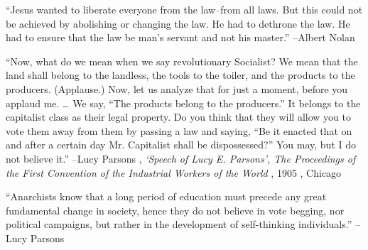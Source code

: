 \documentclass{article}%
\begin{document}
\vspace{1mm}%
\begin{minipage}{\textwidth}%
\flushleft%
“Jesus wanted to liberate everyone from the law–from all laws. But this could not be achieved by abolishing or changing the law. He had to dethrone the law. He had to ensure that the law be man's servant and not his master.”%
\linebreak%
\vspace{1mm}%
–Albert Nolan%
\linebreak%
\vspace{1mm}%
\end{minipage}%
\linebreak%
\vspace{1mm}%
\begin{minipage}{\textwidth}%
\flushleft%
“Now, what do we mean when we say revolutionary Socialist? We mean that the land shall belong to the landless, the tools to the toiler, and the products to the producers. (Applause.) Now, let us analyze that for just a moment, before you applaud me. … We say, “The products belong to the producers.” It belongs to the capitalist class as their legal property. Do you think that they will allow you to vote them away from them by passing a law and saying, “Be it enacted that on and after a certain day Mr. Capitalist shall be dispossessed?” You may, but I do not believe it.”%
\linebreak%
\vspace{1mm}%
–Lucy Parsons%
, \textit{‘Speech of Lucy E. Parsons’, The Proceedings of the First Convention of the Industrial Workers of the World}%
, 1905%
, Chicago%
\linebreak%
\vspace{1mm}%
\end{minipage}%
\linebreak%
\vspace{1mm}%
\begin{minipage}{\textwidth}%
\flushleft%
“Anarchists know that a long period of education must precede any great fundamental change in society, hence they do not believe in vote begging, nor political campaigns, but rather in the development of self{-}thinking individuals.”%
\linebreak%
\vspace{1mm}%
–Lucy Parsons%
\linebreak%
\vspace{1mm}%
\end{minipage}%
\linebreak%
\vspace{1mm}%
\end{document}
